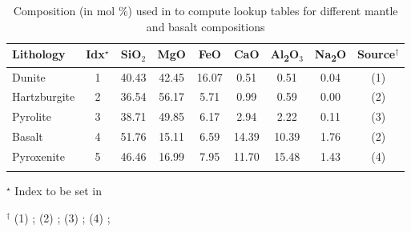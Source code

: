 

\begin{table}[ht]
\caption{Composition (in mol \%) used in \mmaeostitle{} to compute lookup tables for different mantle and basalt compositions
}
\centering
\begin{tabu}{p{3.5cm} c  c  c  c  c  c  c  c} 
 \toprule
 Lithology & Idx$^\star$ & SiO$_2$ & MgO & FeO & CaO & Al\textsubscript{2}O$_3$ & Na\textsubscript{2}O & Source$^\dagger$\\
 \toprule
 \rowfont{\small}
 Dunite & 1 & 40.43 &  42.45 &  16.07  &  0.51  & 0.51  & 0.04 & (1)\\ 
 \midrule
 \rowfont{\small}
 Hartzburgite & 2 & 36.54 &  56.17 &  5.71  &  0.99  & 0.59  & 0.00 & (2)\\
 \midrule
 \rowfont{\small}
 Pyrolite & 3 & 38.71 &  49.85 &  6.17  &  2.94  & 2.22  & 0.11 & (3)\\
 \midrule
 \rowfont{\small}
 Basalt & 4 & 51.76 &  15.11 &  6.59  &  14.39  & 10.39  & 1.76 & (2)\\ 
 \midrule
 \rowfont{\small}
 Pyroxenite & 5 & 46.46 &  16.99 &  7.95  &  11.70  & 15.48  & 1.43 & (4)\\
 \toprule
 \\
\end{tabu}

\raggedright \footnotesize{$^\star$ Index to be set in }\\
\vspace{0.3cm}

\raggedright \footnotesize{$^\dagger$ (1) \citet{kelemen1986contrmin}; (2) \citet{chemia2015jgr}; (3) \citet{workman2005epsl}; (4) \citet{hirschmann2003geology};}\\

\label{table:3}
\end{table}